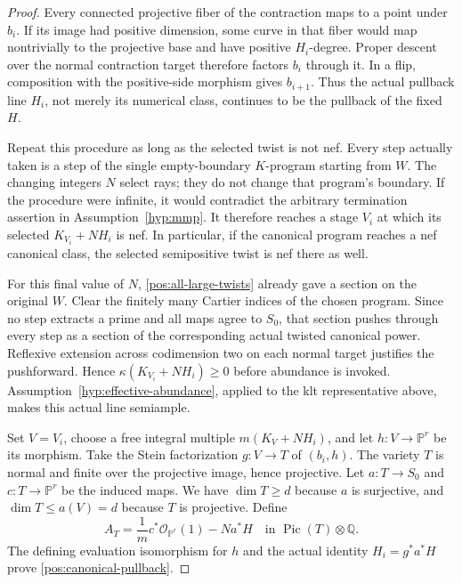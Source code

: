 \documentclass[11pt,letterpaper]{article}
\newcommand{\Q}{\mathbb{Q}}
\newcommand{\PP}{\mathbb{P}}
\newcommand{\OO}{\mathcal{O}}
\DeclareMathOperator{\Pic}{Pic}
\theoremstyle{definition}
\theoremstyle{remark}
\begin{document}
\begin{proof}
Every connected projective fiber of the contraction maps to a point
under \(b_i\). If its image had positive dimension, some curve in that
fiber would map nontrivially to the projective base and have positive
\(H_i\)-degree. Proper descent over the normal contraction target
therefore factors \(b_i\) through it. In a flip, composition with the
positive-side morphism gives \(b_{i+1}\). Thus the actual pullback line
\(H_i\), not merely its numerical class, continues to be the pullback
of the fixed \(H\).

Repeat this procedure as long as the selected twist is not nef.
Every step actually taken is a step of the single empty-boundary
\(K\)-program starting from \(W\). The changing integers \(N\)
select rays; they do not change that program's boundary. If the
procedure were infinite, it would contradict the arbitrary termination
assertion in Assumption~\ref{hyp:mmp}. It therefore reaches a stage
\(V_i\) at which its selected \(K_{V_i}+NH_i\) is nef. In particular,
if the canonical program reaches a nef canonical class, the selected
semipositive twist is nef there as well.

For this final value of \(N\), \eqref{pos:all-large-twists} already
gave a section on the original \(W\). Clear the finitely many Cartier
indices of the chosen program. Since no step extracts a prime and all
maps agree to \(S_0\), that section pushes through every step as a
section of the corresponding actual twisted canonical power.
Reflexive extension across codimension two on each normal target
justifies the pushforward. Hence
\(\kappa(K_{V_i}+NH_i)\geq0\) before abundance is invoked.
Assumption~\ref{hyp:effective-abundance}, applied to the klt
representative above, makes this actual line semiample.

Set \(V=V_i\), choose a free integral multiple
\(m(K_V+NH_i)\), and let \(h:V\to\PP^r\) be its morphism.
Take the Stein factorization \(g:V\to T\) of \((b_i,h)\).
The variety \(T\) is normal and finite over the projective image,
hence projective. Let \(a:T\to S_0\) and \(c:T\to\PP^r\) be the
induced maps. We have \(\dim T\geq d\) because \(a\) is surjective,
and \(\dim T\leq a(V)=d\) because \(T\) is projective. Define
\begin{equation}\label{pos:actual-base-line}
 A_T=\frac1m c^*\OO_{\PP^r}(1)-N a^*H
 \quad\text{in }\Pic(T)\otimes\Q.
\end{equation}
The defining evaluation isomorphism for \(h\) and the actual identity
\(H_i=g^*a^*H\) prove \eqref{pos:canonical-pullback}.
\end{proof}
\end{document}
